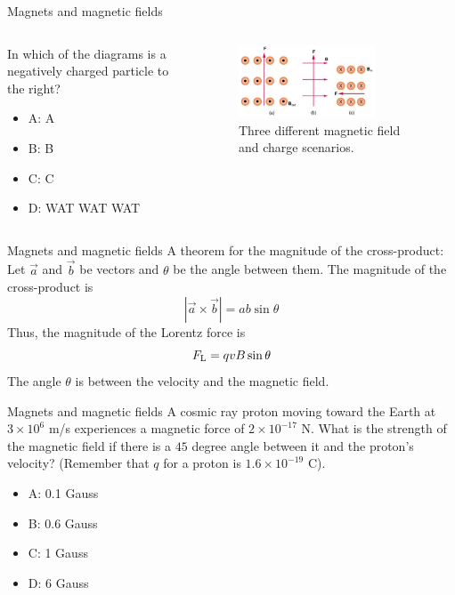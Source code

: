 \documentclass{beamer}
\begin{document}
\begin{frame}{Magnets and magnetic fields}
\begin{columns}[T]
\begin{column}{0.3\textwidth}
In which of the diagrams is a negatively charged particle to the right?
\begin{itemize}
\item A: A
\item B: B
\item C: C
\item D: WAT WAT WAT
\end{itemize}
\end{column}
\begin{column}{0.7\textwidth}
\begin{figure}
\centering
\includegraphics[width=0.75\textwidth]{figures/lorentzProblem.png}
\caption{\label{fig:lorentzProblem5} Three different magnetic field and charge scenarios.}
\end{figure}
\end{column}
\end{columns}
\end{frame}

\begin{frame}{Magnets and magnetic fields}
A theorem for the magnitude of the cross-product:  Let $\vec{a}$ and $\vec{b}$ be vectors and $\theta$ be the angle between them.  The magnitude of the cross-product is
\begin{equation}
|\vec{a} \times \vec{b}| =  a b \sin\theta
\end{equation}
Thus, the magnitude of the Lorentz force is
\begin{equation}
F_{\rm L} = q v B \sin\theta
\end{equation}
The angle $\theta$ is between the velocity and the magnetic field.
\end{frame}

\begin{frame}{Magnets and magnetic fields}
A cosmic ray proton moving toward the Earth at $3 \times 10^{6}$ m/s experiences a magnetic force of $2 \times 10^{-17}$ N. What is the strength of the magnetic field if there is a $45$ degree angle between it and the proton’s velocity?  (Remember that $q$ for a proton is $1.6 \times 10^{-19}$ C).
\begin{itemize}
\item A: 0.1 Gauss
\item B: 0.6 Gauss
\item C: 1 Gauss
\item D: 6 Gauss
\end{itemize}
\end{frame}
\end{document}
